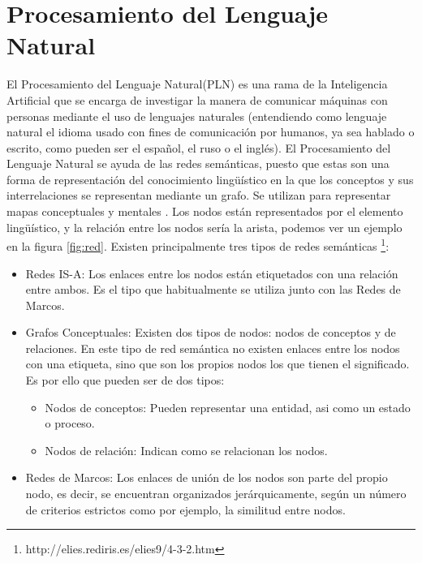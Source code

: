 \section{Procesamiento del Lenguaje Natural}
\label{cap:sec:lenguajenatural}
El Procesamiento del Lenguaje Natural(PLN) es una rama de la Inteligencia Artificial que se encarga de investigar la manera de comunicar máquinas con personas mediante el uso de lenguajes naturales (entendiendo como lenguaje natural el idioma usado con fines de comunicación por humanos, ya sea hablado o escrito, como pueden ser el español, el ruso o el inglés). 
El Procesamiento del Lenguaje Natural se ayuda de las redes semánticas, puesto que estas son una forma de representación del conocimiento lingüístico en la que los conceptos y sus interrelaciones se representan mediante un grafo. Se utilizan para representar mapas conceptuales y mentales \citep{wiki:redSemantica2018}.
Los nodos están representados por el elemento lingüístico, y  la relación entre los nodos sería la arista, podemos ver un ejemplo en la figura \ref{fig:red}.
Existen principalmente tres tipos de redes semánticas \footnote{http://elies.rediris.es/elies9/4-3-2.htm}:
\begin{itemize}
	\item Redes IS-A: Los enlaces entre los nodos están etiquetados con una relación entre ambos. Es el tipo que habitualmente se utiliza junto con las Redes de Marcos.
	\item Grafos Conceptuales: Existen dos tipos de nodos: nodos de conceptos y de relaciones. En este tipo de red semántica no existen enlaces entre los nodos con una etiqueta, sino que son los propios nodos los que tienen el significado. Es por ello que pueden ser de dos tipos:
	\begin{itemize}
		\item Nodos de conceptos: Pueden representar una entidad, asi como un estado o proceso.
		\item Nodos de relación: Indican como se relacionan los nodos.			
	\end{itemize}
	\item Redes de Marcos: Los enlaces de unión de los nodos son parte del propio nodo, es decir, se encuentran organizados jerárquicamente, según un número de criterios estrictos como por ejemplo, la similitud entre nodos.
\end{itemize}

